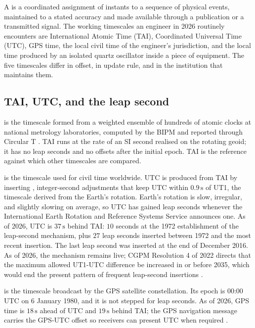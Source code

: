 A  is a coordinated assignment of instants to a
sequence of physical events, maintained to a stated accuracy and
made available through a publication or a transmitted signal. The
working timescales an engineer in 2026 routinely encounters are
International Atomic Time (TAI), Coordinated Universal Time (UTC),
GPS time, the local civil time of the engineer's jurisdiction, and
the local time produced by an isolated quartz oscillator inside a
piece of equipment. The five timescales differ in offset, in update
rule, and in the institution that maintains them.

\subsection{TAI, UTC, and the leap second}

 is the timescale formed
from a weighted ensemble of hundreds of atomic clocks at national
metrology laboratories, computed by the BIPM and reported through
Circular T \cite{web:bipm-circular-t}. TAI runs at the rate of an
SI second realised on the rotating geoid; it has no leap seconds
and no offsets after the initial epoch. TAI is the reference against
which other timescales are compared.

 is the timescale used for
civil time worldwide. UTC is produced from TAI by inserting
, integer-second adjustments that keep UTC
within $0.9 \,\si{\second}$ of UT1, the timescale derived from the
Earth's rotation. Earth's rotation is slow, irregular, and slightly
slowing on average, so UTC has gained leap seconds whenever the
International Earth Rotation and Reference Systems Service announces
one. As of 2026, UTC is $37 \,\si{\second}$ behind TAI: $10$
seconds at the 1972 establishment of the leap-second mechanism, plus
$27$ leap seconds inserted between 1972 and the most recent
insertion. The last leap second was inserted at the end of December
2016. As of 2026, the mechanism remains live; CGPM Resolution 4 of
2022 directs that the maximum allowed UT1-UTC difference be
increased in or before 2035, which would end the present pattern of
frequent leap-second insertions \cite{web:nist-leap-seconds,
web:bipm-cgpm2022-utc}.

 is the timescale broadcast by the GPS satellite
constellation. Its epoch is 00:00 UTC on 6 January 1980, and it is
not stepped for leap seconds. As of 2026, GPS time is $18 \,\si
{\second}$ ahead of UTC and $19 \,\si{\second}$ behind TAI; the GPS
navigation message carries the GPS-UTC offset so receivers can
present UTC when required \cite{web:usno-gps-time}.


